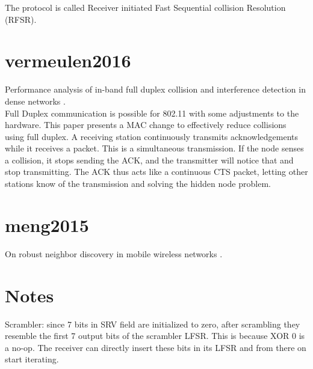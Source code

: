 The protocol is called Receiver initiated Fast Sequential collision Resolution (RFSR).



\section{vermeulen2016}

Performance analysis of in-band full duplex collision and interference detection in dense networks \cite{vermeulen2016}.\\

Full Duplex communication is possible for 802.11 with some adjustments to the hardware. This paper presents a MAC change to effectively reduce collisions using full duplex. A receiving station continuously transmits acknowledgements while it receives a packet. This is a simultaneous transmission. If the node senses a collision, it stops sending the ACK, and the transmitter will notice that and stop transmitting. The ACK thus acts like a continuous CTS packet, letting other stations know of the transmission and solving the hidden node problem.



\section{meng2015}

On robust neighbor discovery in mobile wireless networks \cite{meng2015}.\\






\section{Notes}

Scrambler: since 7 bits in SRV field are initialized to zero, after scrambling they resemble the first 7 output bits of the scrambler LFSR. This is because XOR 0 is a no-op. The receiver can directly insert these bits in its LFSR and from there on start iterating.
